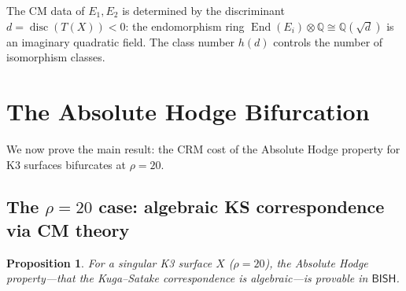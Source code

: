\documentclass[11pt,a4paper]{article}
\theoremstyle{plain}
\newtheorem{proposition}[theorem]{Proposition}
\theoremstyle{definition}
\newcommand{\BISH}{\textsf{BISH}}
\newcommand{\Q}{\mathbb{Q}}
\DeclareMathOperator{\End}{End}
\DeclareMathOperator{\disc}{disc}
\begin{document}
The CM data of $E_1, E_2$ is determined by the discriminant $d = \disc(T(X)) < 0$: the endomorphism ring $\End(E_i) \otimes \Q \cong \Q(\sqrt{d})$ is an imaginary quadratic field. The class number $h(d)$ controls the number of isomorphism classes.


\section{The Absolute Hodge Bifurcation}\label{sec:bifurcation}

We now prove the main result: the CRM cost of the Absolute Hodge property for K3 surfaces bifurcates at $\rho = 20$.

\subsection{The $\rho = 20$ case: algebraic KS correspondence via CM theory}

\begin{proposition}\label{prop:cm-bish}
For a singular K3 surface $X$ ($\rho = 20$), the Absolute Hodge property---that the Kuga--Satake correspondence is algebraic---is provable in $\BISH$.
\end{proposition}
\end{document}
